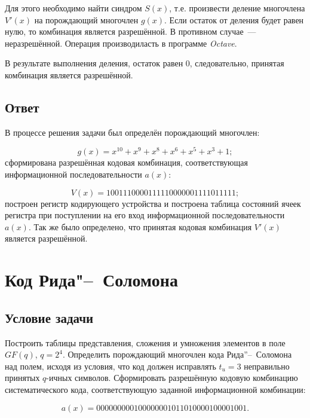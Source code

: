 Для этого необходимо найти синдром $S(x)$, т.е.  произвести деление
многочлена $V'(x)$ на порождающий многочлен $g(x)$. Если остаток от
деления будет равен нулю, то комбинация является разрешённой.  В
противном случае~--- неразрешённой. Операция производиласть в
программе \textit{Octave}.

В результате выполнения деления, остаток равен 0, следовательно,
принятая комбинация является разрешённой.

\subsection{Ответ}

В процессе решения задачи был определён порождающий многочлен:

\begin{equation*}
g(x) = x^{10} + x^9 + x^8 + x^6 + x^5 + x^3 + 1;
\end{equation*}
сформирована разрешённая кодовая комбинация, соответствующая
информационной последовательности $a(x)$:

\begin{equation*}
V(x) = 1001110000111110000001111011111;
\end{equation*}
построен регистр кодирующего устройства и построена таблица состояний
ячеек регистра при поступлении на его вход информационной
последовательности $a(x)$. Так же было определено, что принятая кодовая
комбинация $V'(x)$ является разрешённой.
\newpage

\section{Код Рида"--~Соломона}
\label{sec:Reed-Solomon}

\subsection{Условие задачи}

Построить таблицы представления, сложения и умножения элементов в поле
$GF(q)$, $q = 2^4$. Определить порождающий многочлен кода Рида''--~Соломона над
полем, исходя из условия, что код должен исправлять $t_u = 3$
неправильно принятых $q$-ичных символов. Сформировать разрешённую
кодовую комбинацию систематического кода, соответствующую заданной
информационной комбинации:

\begin{equation*}
  a(x) = 000000000100000001011010000100001001.
\end{equation*}

